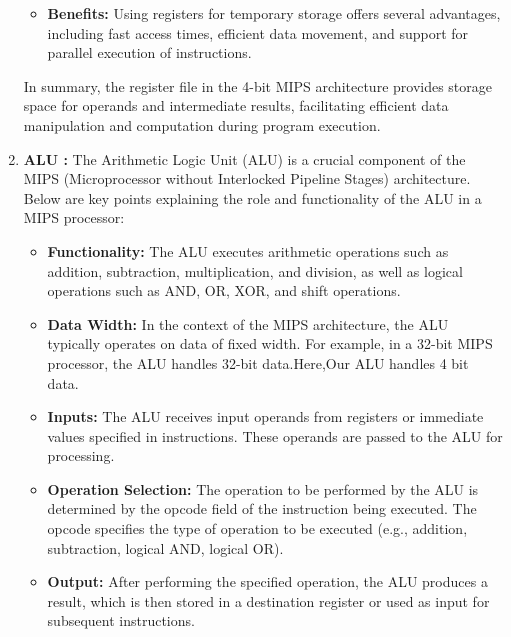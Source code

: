 \documentclass{article}
\begin{document}
\begin{enumerate}
\begin{itemize}
				\item \textbf{Benefits:} Using registers for temporary storage offers several advantages, including fast access times, efficient data movement, and support for parallel execution of instructions.
			\end{itemize}
			
			In summary, the register file in the 4-bit MIPS architecture provides storage space for operands and intermediate results, facilitating efficient data manipulation and computation during program execution.
			
			
			
			\item \textbf{ALU : }
			The Arithmetic Logic Unit (ALU) is a crucial component of the MIPS (Microprocessor without Interlocked Pipeline Stages) architecture. Below are key points explaining the role and functionality of the ALU in a MIPS processor:
			
			\begin{itemize}
				
				
				
				\item \textbf{Functionality:} The ALU executes arithmetic operations such as addition, subtraction, multiplication, and division, as well as logical operations such as AND, OR, XOR, and shift operations.
				
				\item \textbf{Data Width:} In the context of the MIPS architecture, the ALU typically operates on data of fixed width. For example, in a 32-bit MIPS processor, the ALU handles 32-bit data.Here,Our ALU handles 4 bit data.
				
				\item \textbf{Inputs:} The ALU receives input operands from registers or immediate values specified in instructions. These operands are passed to the ALU for processing.
				
				\item \textbf{Operation Selection:} The operation to be performed by the ALU is determined by the opcode field of the instruction being executed. The opcode specifies the type of operation to be executed (e.g., addition, subtraction, logical AND, logical OR).
				
				\item \textbf{Output:} After performing the specified operation, the ALU produces a result, which is then stored in a destination register or used as input for subsequent instructions.
				

\end{itemize}
\end{enumerate}
\end{document}
